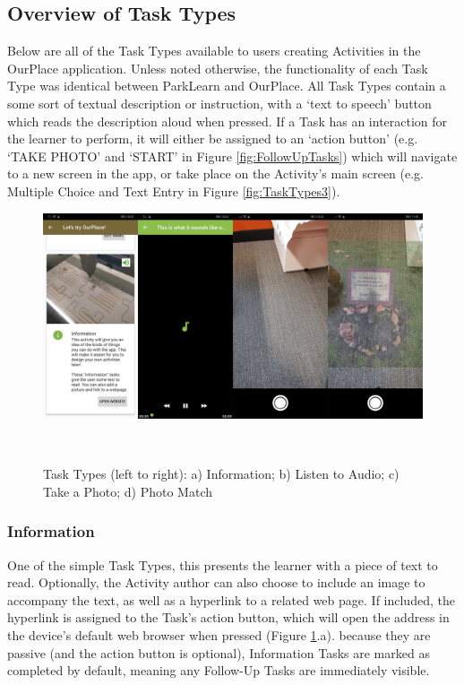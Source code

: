 \subsection{Overview of Task Types}
\label{sec:TaskTypes}
Below are all of the Task Types available to users creating Activities in the OurPlace application. Unless noted otherwise, the functionality of each Task Type was identical between ParkLearn and OurPlace. All Task Types contain a some sort of textual description or instruction, with a `text to speech' button which reads the description aloud when pressed. If a Task has an interaction for the learner to perform, it will either be assigned to an `action button' (e.g. `TAKE PHOTO' and `START' in Figure \ref{fig:FollowUpTasks}) which will navigate to a new screen in the app, or take place on the Activity's main screen (e.g. Multiple Choice and Text Entry in Figure \ref{fig:TaskTypes3}). 

\begin{figure}
  \centering
  \includegraphics[width=1\columnwidth]{images/chapter05/tasktypes1.png}
  \caption{Task Types (left to right): a) Information; b) Listen to Audio; c) Take a Photo; d) Photo Match}~\label{fig:TaskTypes1}
\end{figure}

\subsubsection*{Information}
One of the simple Task Types, this presents the learner with a piece of text to read. Optionally, the Activity author can also choose to include an image to accompany the text, as well as a hyperlink to a related web page. If included, the hyperlink is assigned to the Task's action button, which will open the address in the device's default web browser when pressed (Figure \ref{fig:TaskTypes1}.a). because they are passive (and the action button is optional), Information Tasks are marked as completed by default, meaning any Follow-Up Tasks are immediately visible.

